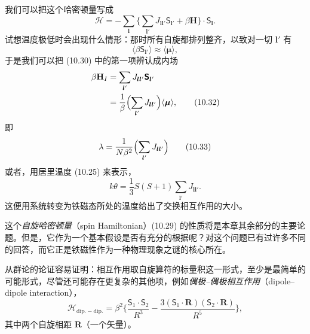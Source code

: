 我们可以把这个哈密顿量写成
\begin{equation*}
\mathcal{H}=-\sum_{\boldsymbol{l}}\bigl\{\sum_{\boldsymbol{l}'}J_{\boldsymbol{l}\boldsymbol{l}'}\boldsymbol{\mathsf{S}}_{\boldsymbol{l}'}+\beta\mathbf{H}\bigr\}\cdot\boldsymbol{\mathsf{S}}_{\boldsymbol{l}}.
\tag{10.30}
\end{equation*}
试想温度极低时会出现什么情形：那时所有自旋都排列整齐，以致对一切 $\boldsymbol{l}'$ 有
\begin{equation*}
\langle\beta\boldsymbol{\mathsf{S}}_{\boldsymbol{l}'}\rangle\approx\langle\boldsymbol{\mu}\rangle,
\tag{10.31}
\end{equation*}
于是我们可以把 (10.30) 中的第一项辨认成内场
\begin{align*}
\beta\mathbf{H}_{I}&=\sum_{\boldsymbol{l}'}J_{\boldsymbol{l}\boldsymbol{l}'}\boldsymbol{\mathsf{S}}_{\boldsymbol{l}'}\\
&=\frac{1}{\beta}\Bigl(\sum_{\boldsymbol{l}'}J_{\boldsymbol{l}\boldsymbol{l}'}\Bigr)\langle\boldsymbol{\mu}\rangle,
\tag{10.32}
\end{align*}
即
\begin{equation*}
\lambda=\frac{1}{N\beta^{2}}\Bigl(\sum_{\boldsymbol{l}'}J_{\boldsymbol{l}\boldsymbol{l}'}\Bigr)
\tag{10.33}
\end{equation*}
或者，用居里温度 (10.25) 来表示，
\begin{equation*}
k\theta=\frac{1}{3}S(S+1)\sum_{\boldsymbol{l}'}J_{\boldsymbol{l}\boldsymbol{l}'}.
\tag{10.34}
\end{equation*}
这便用系统转变为铁磁态所处的温度给出了交换相互作用的大小。

这个\emph{自旋哈密顿量}（spin Hamiltonian）(10.29) 的性质将是本章其余部分的主要论题。但是，它作为一个基本假设是否有充分的根据呢？对这个问题已有过许多不同的回答，而它正是铁磁性作为一种物理现象之谜的核心所在。

从群论的论证容易证明：相互作用取自旋算符的标量积这一形式，至少是最简单的可能形式，尽管还可能存在更复杂的其他项，例如\emph{偶极–偶极相互作用}（dipole–dipole interaction），
\begin{equation*}
\mathcal{H}_{\mathrm{dip.-dip.}}=\beta^{2}\biggl\{\frac{\boldsymbol{\mathsf{S}}_{1}\cdot\boldsymbol{\mathsf{S}}_{2}}{R^{3}}-\frac{3(\boldsymbol{\mathsf{S}}_{1}\cdot\mathbf{R})(\boldsymbol{\mathsf{S}}_{2}\cdot\mathbf{R})}{R^{5}}\biggr\},
\tag{10.35}
\end{equation*}
其中两个自旋相距 $\mathbf{R}$（一个矢量）。

